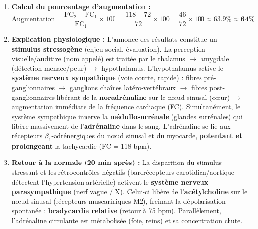 \documentclass[11pt]{article}
\begin{document}
\begin{corrige}
\begin{enumerate}
\item \textbf{Calcul du pourcentage d'augmentation :}
\[
\text{Augmentation} = \frac{\text{FC}_2 - \text{FC}_1}{\text{FC}_1} \times 100 = \frac{118 - 72}{72} \times 100 = \frac{46}{72} \times 100 \approx \num{63,9}\% \approx \textbf{64\%}
\]
\item \textbf{Explication physiologique :}
L'annonce des résultats constitue un \textbf{stimulus stressogène} (enjeu social, évaluation). La perception visuelle/auditive (nom appelé) est traitée par le thalamus $\to$ amygdale (détection menace/peur) $\to$ hypothalamus. L'hypothalamus active le \textbf{système nerveux sympathique} (voie courte, rapide) : fibres pré-ganglionnaires $\to$ ganglions chaînes latéro-vertébraux $\to$ fibres post-ganglionnaires libérant de la \textbf{noradrénaline} sur le nœud sinusal (cœur) $\to$ augmentation immédiate de la fréquence cardiaque (FC).
Simultanément, le système sympathique innerve la \textbf{médullosurrénale} (glandes surrénales) qui libère massivement de l'\textbf{adrénaline} dans le sang. L'adrénaline se lie aux récepteurs $\beta_1$-adrénergiques du nœud sinusal et du myocarde, \textbf{potentant et prolongeant} la tachycardie (FC = 118 bpm).
\item \textbf{Retour à la normale (20 min après) :}
La disparition du stimulus stressant et les rétrocontrôles négatifs (barorécepteurs carotidien/aortique détectent l'hypertension artérielle) activent le \textbf{système nerveux parasympathique} (nerf vague / X). Celui-ci libère de l'\textbf{acétylcholine} sur le nœud sinusal (récepteurs muscariniques M2), freinant la dépolarisation spontanée : \textbf{bradycardie relative} (retour à 75 bpm). Parallèlement, l'adrénaline circulante est métabolisée (foie, reins) et sa concentration chute.
\end{enumerate}
\end{corrige}
\end{document}
